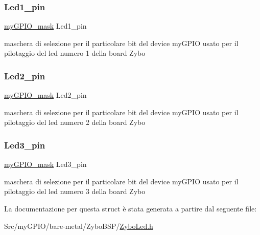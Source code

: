 \subsubsection{\texorpdfstring{Led1\+\_\+pin}{Led1\_pin}}
{\footnotesize\ttfamily \hyperlink{group__bare-metal_ga402a0d20afc0cb7c25554b8b023f4253}{my\+G\+P\+I\+O\+\_\+mask} Led1\+\_\+pin}

maschera di selezione per il particolare bit del device my\+G\+P\+IO usato per il pilotaggio del led numero 1 della board Zybo \mbox{\label{struct_zybo_led__t_a4213c78e5a02b1476222e989c2eceb04}} 
\subsubsection{\texorpdfstring{Led2\+\_\+pin}{Led2\_pin}}
{\footnotesize\ttfamily \hyperlink{group__bare-metal_ga402a0d20afc0cb7c25554b8b023f4253}{my\+G\+P\+I\+O\+\_\+mask} Led2\+\_\+pin}

maschera di selezione per il particolare bit del device my\+G\+P\+IO usato per il pilotaggio del led numero 2 della board Zybo \mbox{\label{struct_zybo_led__t_afc64d1407f30615e374bf9f06721842a}} 
\subsubsection{\texorpdfstring{Led3\+\_\+pin}{Led3\_pin}}
{\footnotesize\ttfamily \hyperlink{group__bare-metal_ga402a0d20afc0cb7c25554b8b023f4253}{my\+G\+P\+I\+O\+\_\+mask} Led3\+\_\+pin}

maschera di selezione per il particolare bit del device my\+G\+P\+IO usato per il pilotaggio del led numero 3 della board Zybo 

La documentazione per questa struct è stata generata a partire dal seguente file\+:\begin{DoxyCompactItemize}
\item 
Src/my\+G\+P\+I\+O/bare-\/metal/\+Zybo\+B\+S\+P/\hyperlink{_zybo_led_8h}{Zybo\+Led.\+h}\end{DoxyCompactItemize}
